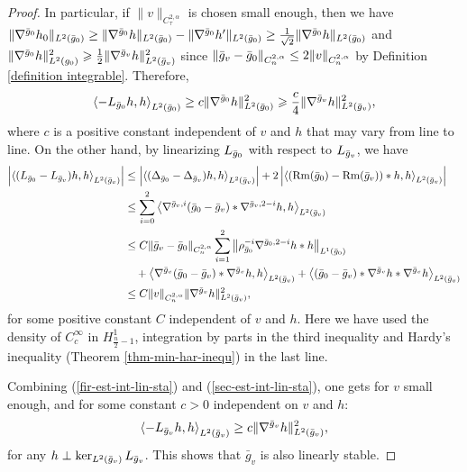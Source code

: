 \documentclass[a4paper,11pt,reqno]{amsart}
\def\Rm{\mathop{\rm Rm}\nolimits}
\def\Rm{\mathop{\rm Rm}\nolimits}
\numberwithin{equation}{section}
\begin{document}
\begin{proof}
In particular, if $\|v\|_{C^{2,\alpha}_\tau}$ is chosen small enough, then we have $\|\nabla^{\Bar{g}_0}h_0\|_{L^2(\bar{g}_0)}\geq \|\nabla^{\Bar{g}_0}h\|_{L^2(\bar{g}_0)}-\|\nabla^{\Bar{g}_0}h'\|_{L^2(\bar{g}_0)}\geq \frac{1}{\sqrt{2}}\|\nabla^{\Bar{g}_0}h\|_{L^2(\bar{g}_0)}$ and $\|\nabla^{\Bar{g}_0}h\|^2_{L^2(g_0)}\geqslant \frac{1}{2}\|\nabla^{\Bar{g}_v}h\|_{L^2(\bar{g}_v)}^2$ since $\|\Bar{g}_v-\Bar{g}_0\|_{C_{n}^{2,\alpha}}\leq 2\|v\|_{C_{n}^{2,\alpha}}$ by Definition \ref{definition integrable}. Therefore,
\begin{equation}
\left<-L_{\Bar{g}_0} h,h\right>_{L^2(\bar{g}_0)}\geq c\|\nabla^{\Bar{g}_0}h\|^2_{L^2(\bar{g}_0)}\geqslant \frac{c}{4}\|\nabla^{\Bar{g}_v}h\|_{L^2(\bar{g}_v)}^2,\label{fir-est-int-lin-sta}
\end{equation}
where $c$ is a positive constant independent of $v$ and $h$ that may vary from line to line. On the other hand, by linearizing $L_{\Bar{g}_0}$ with respect to $L_{\Bar{g}_v}$, we have
\begin{equation}
\begin{split}\label{sec-est-int-lin-sta}
\left|\left<(L_{\Bar{g}_0}-L_{\Bar{g}_v}) h,h\right>_{L^2(\bar{g}_v)}\right|&\leq\left|\left<(\Delta_{\Bar{g}_0}-\Delta_{\Bar{g}_v}) h,h\right>_{L^2(\bar{g}_v)}\right|+2\left|\left<\left(\Rm(\Bar{g}_0)-\Rm(\Bar{g}_v)\right)\ast h,h\right>_{L^2(\bar{g}_v)}\right|\\
&\leq\sum_{i=0}^2\left\langle\nabla^{\bar{g}_v,i}(\bar{g}_0-\bar{g}_v)\ast\nabla^{\bar{g}_v,2-i}h, h \right\rangle_{L^2(\bar{g}_v)}\\
&\leq C\|\bar{g}_v-\bar{g}_0\|_{C^{2,\alpha}_{n}}\sum_{i=1}^2\left\|\rho_{\bar{g}_0}^{-i}\nabla^{\bar{g}_0,2-i}h\ast h \right\|_{L^1(\bar{g}_0)}\\
&\quad+\left\langle\nabla^{\bar{g}_v}(\bar{g}_0-\bar{g}_v)\ast\nabla^{\bar{g}_v}h, h\right\rangle_{L^2(\bar{g}_v)}+\left\langle(\bar{g}_0-\bar{g}_v)\ast\nabla^{\bar{g}_v}h\ast \nabla^{\bar{g}_v}h\right\rangle_{L^2(\bar{g}_v)}\\
&\leq C\|v\|_{C^{2,\alpha}_{n}}\|\nabla^{\Bar{g}_v}h\|^2_{L^2(\bar{g}_v)},
\end{split}
\end{equation}
for some positive constant $C$ independent of $v$ and $h$.
 Here we have used the density of $C_c^\infty$ in $H^1_{\frac{n}{2}-1}$, integration by parts in the third inequality and Hardy's inequality (Theorem \ref{thm-min-har-inequ}) in the last line.

Combining (\ref{fir-est-int-lin-sta}) and (\ref{sec-est-int-lin-sta}), one gets for $v$ small enough, and for some constant $c>0$ independent on $v$ and $h$:
\begin{equation}
\left<-L_{\Bar{g}_v} h,h\right>_{L^2(\bar{g}_v)}\geq c\|\nabla^{\Bar{g}_v}h\|^2_{L^2(\bar{g}_v)},
\end{equation}
for any $h\perp\ker_{L^2(\Bar{g}_v)} L_{\Bar{g}_v}$. This shows that $\bar{g}_v$ is also linearly stable.
	\end{proof}
	
\end{document}
